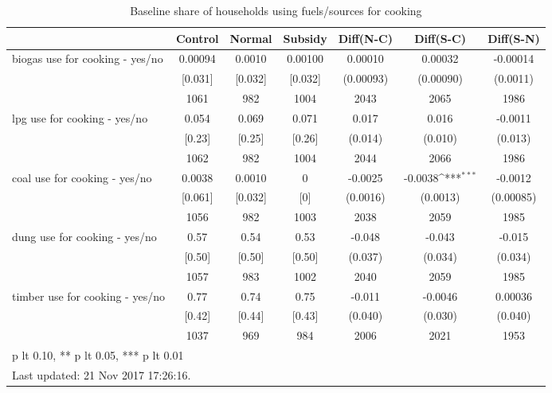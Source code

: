 \begin{table}[htbp]\centering
\def\sym#1{\ifmmode^{#1}\else\(^{#1}\)\fi}
\caption{Baseline share of households using fuels/sources for cooking \label{tab:"balance"}}
\begin{tabular*}{1\hsize}{@{\hskip\tabcolsep\extracolsep\fill}l*{1}{cccccc}}
\toprule
                                &  Control&   Normal&  Subsidy&Diff(N-C)         &Diff(S-C)         &Diff(S-N)         \\
\midrule
biogas use for cooking  - yes/no&  0.00094&   0.0010&  0.00100&  0.00010         &  0.00032         & -0.00014         \\
                                &  [0.031]&  [0.032]&  [0.032]&(0.00093)         &(0.00090)         & (0.0011)         \\
                                &     1061&      982&     1004&     2043         &     2065         &     1986         \\
lpg use for cooking  - yes/no   &    0.054&    0.069&    0.071&    0.017         &    0.016         &  -0.0011         \\
                                &   [0.23]&   [0.25]&   [0.26]&  (0.014)         &  (0.010)         &  (0.013)         \\
                                &     1062&      982&     1004&     2044         &     2066         &     1986         \\
coal use for cooking  - yes/no  &   0.0038&   0.0010&        0&  -0.0025         &  -0.0038\sym{***}&  -0.0012         \\
                                &  [0.061]&  [0.032]&      [0]& (0.0016)         & (0.0013)         &(0.00085)         \\
                                &     1056&      982&     1003&     2038         &     2059         &     1985         \\
dung use for cooking  - yes/no  &     0.57&     0.54&     0.53&   -0.048         &   -0.043         &   -0.015         \\
                                &   [0.50]&   [0.50]&   [0.50]&  (0.037)         &  (0.034)         &  (0.034)         \\
                                &     1057&      983&     1002&     2040         &     2059         &     1985         \\
timber use for cooking  - yes/no&     0.77&     0.74&     0.75&   -0.011         &  -0.0046         &  0.00036         \\
                                &   [0.42]&   [0.44]&   [0.43]&  (0.040)         &  (0.030)         &  (0.040)         \\
                                &     1037&      969&      984&     2006         &     2021         &     1953         \\
\bottomrule
\multicolumn{7}{l}{\footnotesize * p lt 0.10, ** p lt 0.05, *** p lt 0.01}\\
\multicolumn{7}{l}{\footnotesize Last updated: 21 Nov 2017 17:26:16.}\\
\end{tabular*}
\end{table}
